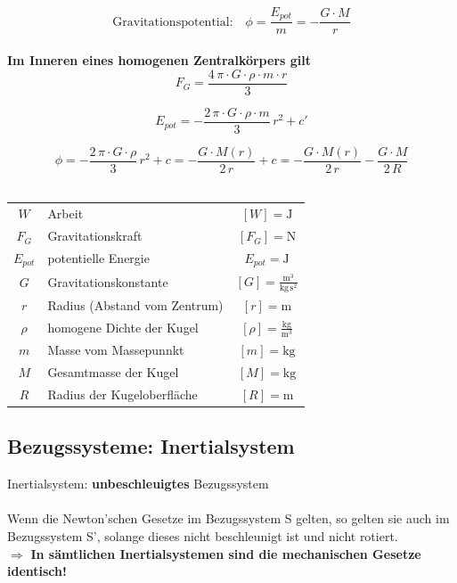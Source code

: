 			$$ \boxed{ \text{Gravitationspotential:} \quad \phi = \frac{E_{pot}}{m} = - \frac{G \cdot M}{r}}  $$ \\

			\textbf{Im Inneren eines homogenen Zentralkörpers gilt} \\
			
				$$ \boxed{ F_G = \frac{4 \, \pi \cdot G \cdot \rho \cdot m \cdot r}{3} }$$ 
				
				$$ \boxed{ E_{pot} = - \frac{2 \,  \pi \cdot G \cdot \rho \cdot m}{3} \, r^2 + c' } $$
				
				$$ \boxed{ \phi = - \frac{2 \,  \pi \cdot G \cdot \rho}{3} \, r^2 + c = - \frac{G \cdot M(r)}{2 \, r}  + c = - \frac{G \cdot M(r)}{2 \, r} - \frac{G \cdot M}{2 \, R} } $$ \\
				
			\begin{tabular}{c l c}
				$W$ & Arbeit & $[W] = \mathrm{J} $ \\
				$F_G$ & Gravitationskraft & $[F_G] = \mathrm{N}$ \\
				$E_{pot}$ & potentielle Energie & $E_{pot} = \mathrm{J}$ \\
				$G$ & Gravitationskonstante & $[G] = \mathrm{\frac{m^3}{kg \, s^2}}$ \\	
				$r$ & Radius (Abstand vom Zentrum) & $[r] = \mathrm{m}$ \\
				$\rho$ & homogene Dichte der Kugel & $[\rho] = \mathrm{\frac{kg}{m^3}}$ \\
				$m$ & Masse vom Massepunnkt & $[m] = \mathrm{kg}$ \\
				$M$ & Gesamtmasse der Kugel & $[M] = \mathrm{kg}$ \\
				$R$ & Radius der Kugeloberfläche & $[R] = \mathrm{m}$ \\
			\end{tabular}

	\subsection{Bezugssysteme: Inertialsystem}
		Inertialsystem: \textbf{unbeschleuigtes} Bezugssystem \\
		\\
		Wenn die Newton'schen Gesetze im Bezugssystem S gelten, so gelten sie auch im Bezugssystem S', solange dieses nicht beschleunigt ist und nicht rotiert. \\
		$\Rightarrow$ \textbf{In sämtlichen Inertialsystemen sind die mechanischen Gesetze identisch!} \\

